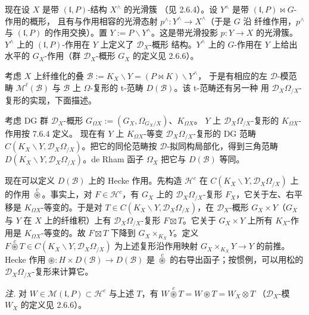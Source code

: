  现在设 $X$ 是带 $(\mathfrak{l},P)$-结构 $X^{\wedge}$ 的光滑簇
（见 2.6.4）。设 $Y^{\wedge}$ 是带 $(\mathfrak{l},P)\bowtie G$-作用的概形，
且有与作用相容的光滑态射 $p^{\wedge}:Y^{\wedge}\to X^{\wedge}$（于是 $G$ 沿
纤维作用，$p^{\wedge}$ 与 $(\mathfrak{l},P)$ 的作用交换）。置
$Y:=P\backslash Y^{\wedge}$。这是带光滑投影 $p:Y\to X$ 的光滑簇。
$Y^{\wedge}$ 上的 $(\mathfrak{l},P)$-作用在 $Y$ 上定义了 $\mathcal{D}_{X}$-概形
结构。$Y^{\wedge}$ 上的 $G$-作用在 $Y$ 上给出水平的 $G_{X}$-作用（群
$\mathcal{D}_{X}$-概形 $G_{X}$ 的定义见 2.6.6）。


考虑 $X$ 上纤维化的叠 $\mathcal{B}:=K_{X}\backslash Y=(P\bowtie K)\backslash Y^{\wedge}$，
于是有相应的左 $\mathcal{D}$-模范畴 $\mathcal{M}^{\ell}(\mathcal{B})$ 与
$\mathcal{B}$ 上 $\Omega$-复形的 t-范畴 $D(\mathcal{B})$。该 t-范畴还有另一种
用 $\mathcal{D}_{X}\Omega_{/X}$-复形的实现，下面描述。

考虑 DG 群 $\mathcal{D}_{X}$-概形
$G_{\Omega X}:=(G_{X},\Omega_{G_{X}/X})$、$K_{\Omega X}$。
$Y$ 上 $\mathcal{D}_{X}\Omega_{/X}$-复形的 $K_{\Omega X}$-作用按 7.6.4 定义。
现在有 $Y$ 上 $K_{\Omega X}$-等变 $\mathcal{D}_{X}\Omega_{/X}$-复形的 DG 范畴
$C(K_{X}\backslash Y,\mathcal{D}_{X}\Omega_{/X})$。把它的同伦范畴按
$\mathcal{D}$-拟同构局部化，得到三角范畴
$D(K_{X}\backslash Y,\mathcal{D}_{X}\Omega_{/X})$。de Rham 函子 $\Omega_{X}$
把它与 $D(\mathcal{B})$ 等同。

现在可以定义 $D(\mathcal{B})$ 上的 Hecke 作用。先构造 $\mathcal{H}^{c}$ 在
$C(K_{X}\backslash Y,\mathcal{D}_{X}\Omega_{/X})$ 上的作用
$\overset{c}{\circledast}$。事实上，对 $F\in\mathcal{H}^{c}$，有 $G_{X}$ 上的
$\mathcal{D}_{X}\Omega_{/X}$-复形 $F_{X}$，它关于左、右平移是
$K_{\Omega X}$-等变的。于是对
$T\in C(K_{X}\backslash Y,\mathcal{D}_{X}\Omega_{/X})$，在 $\mathcal{D}_{X}$-概形
$G_{X}\times Y$（$G_{X}$ 与 $Y$ 在 $X$ 上的纤维积）上有
$\mathcal{D}_{X}\Omega_{/X}$-复形 $F\boxtimes T$。它关于 $G_{X}\times Y$ 上所有
$K_{X}$-作用是 $K_{\Omega X}$-等变的。故 $F\boxtimes T$ 下降到
$G_{X}\times_{K_{X}}Y$。定义
$F\overset{c}{\circledast}T\in C(K_{X}\backslash Y,\mathcal{D}_{X}\Omega_{/X})$
为上述复形沿作用映射 $G_{X}\times_{K_{X}}Y\to Y$ 的前推。Hecke 作用
$\circledast:H\times D(\mathcal{B})\longrightarrow D(\mathcal{B})$ 是
$\overset{c}{\circledast}$ 的右导出函子；按惯例，可以用松的
$\mathcal{D}_{X}\Omega_{/X}$-复形来计算它。

\emph{注.} 对 $W\in\mathcal{M}(\mathfrak{l},P)\subset\mathcal{H}^{c}$ 与上述
$T$，有 $W\overset{c}{\circledast}T=W\circledast{}T=W_{X}\otimes T$
（$\mathcal{D}_{X}$-模 $W_{X}$ 的定义见 2.6.6）。

